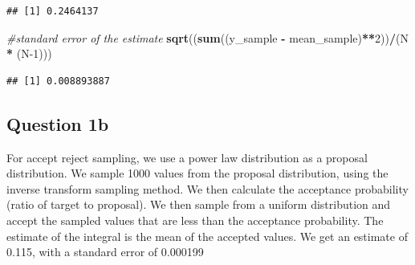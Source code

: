 \documentclass[
]{article}
\newenvironment{Shaded}{\begin{snugshade}}{\end{snugshade}}
\newcommand{\CommentTok}[1]{\textcolor[rgb]{0.56,0.35,0.01}{\textit{#1}}}
\newcommand{\DecValTok}[1]{\textcolor[rgb]{0.00,0.00,0.81}{#1}}
\newcommand{\FunctionTok}[1]{\textcolor[rgb]{0.13,0.29,0.53}{\textbf{#1}}}
\newcommand{\NormalTok}[1]{#1}
\newcommand{\SpecialCharTok}[1]{\textcolor[rgb]{0.81,0.36,0.00}{\textbf{#1}}}
\begin{document}
\begin{verbatim}
## [1] 0.2464137
\end{verbatim}

\begin{Shaded}
\begin{Highlighting}[]
\CommentTok{\#standard error of the estimate}
\FunctionTok{sqrt}\NormalTok{((}\FunctionTok{sum}\NormalTok{((y\_sample }\SpecialCharTok{{-}}\NormalTok{ mean\_sample)}\SpecialCharTok{**}\DecValTok{2}\NormalTok{))}\SpecialCharTok{/}\NormalTok{(N }\SpecialCharTok{*}\NormalTok{ (N}\DecValTok{{-}1}\NormalTok{)))}
\end{Highlighting}
\end{Shaded}

\begin{verbatim}
## [1] 0.008893887
\end{verbatim}

\hypertarget{question-1b}{%
\subsection{Question 1b}\label{question-1b}}

For accept reject sampling, we use a power law distribution as a
proposal distribution. We sample 1000 values from the proposal
distribution, using the inverse transform sampling method. We then
calculate the acceptance probability (ratio of target to proposal). We
then sample from a uniform distribution and accept the sampled values
that are less than the acceptance probability. The estimate of the
integral is the mean of the accepted values. We get an estimate of
0.115, with a standard error of 0.000199
\end{document}
